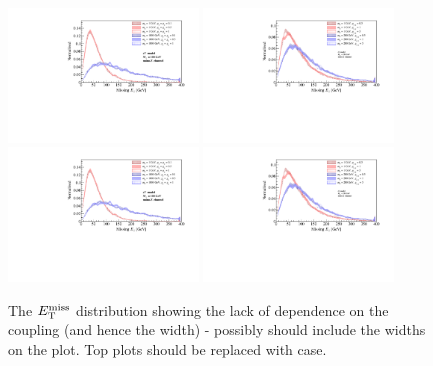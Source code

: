 \begin{figure}[t]
  \begin{center}
    \includegraphics[width=0.45\textwidth]{figures/SVD_MET.pdf}
    \includegraphics[width=0.45\textwidth]{figures/TSD_MET.pdf}
    \includegraphics[width=0.45\textwidth]{figures/SVD_MET.pdf}
    \includegraphics[width=0.45\textwidth]{figures/TSD_MET.pdf}
    \caption{The $E_{\mathrm{T}}^{\mathrm{miss}}$ distribution showing the lack of dependence on the coupling (and hence the width) - possibly should include the widths on the plot. Top plots should be replaced with \monojet case.}
    \label{MET_SVD_monoZ}
  \end{center}
\end{figure}

